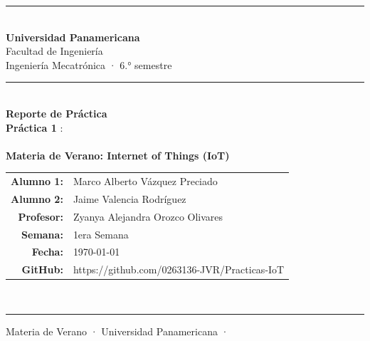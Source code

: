 \documentclass[12pt, letterpaper]{article}
\begin{document}

\begin{titlepage}
  \centering

  {\color{upBlue}\rule{\linewidth}{1.5pt}}\\[0.4cm]

  {\Large \textbf{\color{upBlue} Universidad Panamericana}}\\[0.2cm]
  {\large Facultad de Ingeniería}\\[0.2cm]
  {\large Ingeniería Mecatrónica · 6.° semestre}\\[0.4cm]

  {\color{roseMain}\rule{\linewidth}{0.8pt}}\\[1cm]

  {\LARGE \textbf{\color{upBlue} Reporte de Práctica}}\\[0.5cm]

  {\huge \textbf{\color{roseMain}
    Práctica 1} :%
    \vspace{0.3cm}\\
    \underline{\hspace{9cm}}          %
  }\\[0.8cm]

  {\large \textbf{Materia de Verano: Internet of Things (IoT)}}\\[2cm]

  \begin{tabular}{rl}
    \textbf{Alumno 1:}  & Marco Alberto Vázquez Preciado \\[0.5em]%
    \textbf{Alumno 2:}  & Jaime Valencia Rodríguez \\[0.5em]%
    \textbf{Profesor:}  & Zyanya Alejandra Orozco Olivares \\[0.5em] %
    \textbf{Semana:}    & 1era Semana\\[0.5em] %
    \textbf{Fecha:}     & \today                              \\[0.5em]
    \textbf{GitHub:}    & https://github.com/0263136-JVR/Practicas-IoT \\[0.5em] %
  \end{tabular}\\[2cm]

  {\color{upBlue}\rule{\linewidth}{1.5pt}}
  \vfill
  {\small\color{gray} Materia de Verano · Universidad Panamericana · \the\year}
\end{titlepage}
\end{document}
